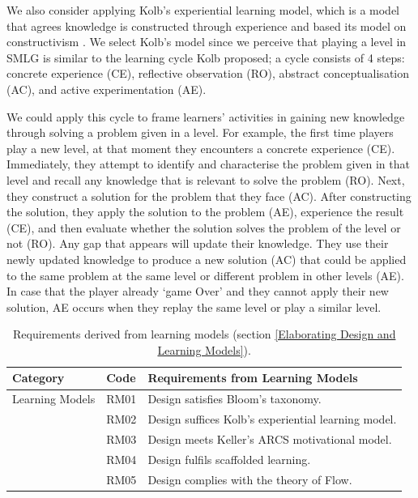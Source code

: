 \documentclass[12pt, a4paper]{report} \usepackage[titletoc]{appendix}
\begin{document}
We also consider applying Kolb's experiential learning model, which is a model that agrees knowledge is constructed through experience and based its model on constructivism \cite{kolb2014experiential}. We select Kolb's model since we perceive that playing a level in SMLG is similar to the learning cycle Kolb proposed; a cycle consists of 4 steps: concrete experience (CE), reflective observation (RO), abstract conceptualisation (AC), and active experimentation (AE). 

We could apply this cycle to frame learners' activities in gaining new knowledge through solving a problem given in a level. For example, the first time players play a new level, at that moment they encounters a concrete experience (CE). Immediately, they attempt to identify and characterise the problem given in that level and recall any knowledge that is relevant to solve the problem (RO). Next, they construct a solution for the problem that they face (AC). After constructing the solution, they apply the solution to the problem (AE), experience the result (CE), and then evaluate whether the solution solves the problem of the level or not (RO). Any gap that appears will update their knowledge. They use their newly updated knowledge to produce a new solution (AC) that could be applied to the same problem at the same level or different problem in other levels (AE). In case that the player already `game Over' and they cannot apply their new solution, AE occurs when they replay the same level or play a similar level.

\begin{table}[ht]
\caption{Requirements derived from learning models (section \ref{Elaborating Design and Learning Models}).}
\label{design-learning-models}
\begin{center}
\begin{tabular}{ p{2cm}p{1cm}p{10cm} } 
\hline
Category & Code & Requirements from Learning Models \\
\hline
\multirow{1}{2cm}{Learning Models} 
& RM01 & Design satisfies Bloom's taxonomy. \\
& RM02 & Design suffices Kolb's experiential learning model. \\ 
& RM03 & Design meets Keller's ARCS motivational model. \\
& RM04 & Design fulfils scaffolded learning. \\
& RM05 & Design complies with the theory of Flow. \\ 
\hline
\end{tabular}
\end{center}
\end{table}
\end{document}
